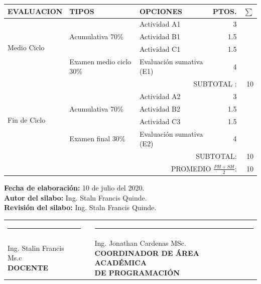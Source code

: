 \documentclass[a4pa<per,12pt,spanish]{article}
\begin{document}
\begin{tabular}[H]{|m{2.5cm}|m{4cm}|m{5cm}|r|r|}
  \hline
  \rowcolor{green!10}
  EVALUACION & TIPOS & OPCIONES & PTOS. & $\sum$ \\ \hline \cline{1-4}
   \multirow{4}{*}{Medio Ciclo} & \multirow{3}{*}{Acumulativa 70\%} & Actividad A1 & 3 \\ \cline{3-3}
             &                                    & Actividad B1 & 1.5 \\ \cline{3-3}
             &                                    & Actividad C1 & 1.5\\ \cline{2-3}
             &Examen medio ciclo 30\% & Evaluación sumativa (E1) &4 \\ \hline 
  \multicolumn{4}{r}{SUBTOTAL :} & 10 \\ \hline
   \multirow{4}{*}{Fin de Ciclo} & \multirow{3}{*}{Acumulativa 70\%} & Actividad A2 & 3 \\ \cline{3-3}
             &                                    & Actividad B2 & 1.5 \\ \cline{3-3}
             &                                    & Actividad C3 & 1.5\\ \cline{2-3}
             &Examen final 30\% & Evaluación sumativa (E2) &4 \\ \hline
  \multicolumn{4}{|r}{SUBTOTAL:} & 10 \\ \hline
  \multicolumn{4}{|r}{PROMEDIO $ \frac{PH+SH}{2} $:} & 10 \\ \hline

  
\end{tabular}



\setlength{\bibleftmargin}{.125in}
\setlength{\bibindent}{-\bibleftmargin}


\newpage
\vspace{0.3cm}


\noindent \textbf{Fecha de elaboración:} 10 de julio del 2020. \\
\textbf{Autor del silabo: } Ing. Staln Francis Quinde. \\
\textbf{Revisión del silabo: } Ing. Staln Francis Quinde. \\

\vspace{4cm}

\vspace{3cm}
\begin{center}
\begin{tabular}[H]{m{8cm}lm{8cm}}
  \rule{7cm}{0.4pt}& &\rule{7cm}{0.4pt} \\
  \makecell[c]{Ing. Stalin Francis Ms.c\\\textbf{ DOCENTE}}  & &\makecell[c]{Ing. Jonathan Cardenas  MSc. \\ \textbf{COORDINADOR DE ÁREA ACADÉMICA} \\ \textbf{DE PROGRAMACIÓN}} \\ 
\end{tabular}
\end{center}
\end{document}
